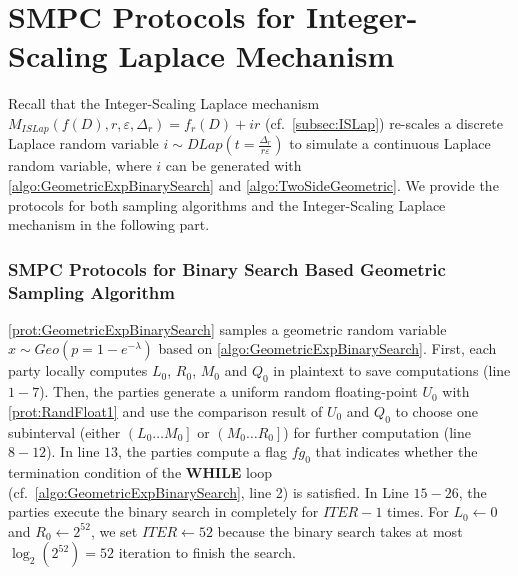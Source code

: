 
                  \section{SMPC Protocols for Integer-Scaling Laplace Mechanism}
                  \label{sec:MPCProtocolsforInteger-ScalingLaplaceMechanism}
                  Recall that the Integer-Scaling Laplace mechanism $M_{ISLap}\left(f\left(D\right),r,\varepsilon,\Delta _r\right)=f_r\left(D\right) +ir$ (cf.~\autoref{subsec:ISLap}) re-scales a discrete Laplace random variable $i \sim DLap\left(t=\frac{\Delta_r}{r\varepsilon}\right) $ to simulate a continuous Laplace random variable, where $i$ can be generated with \autoref{algo:GeometricExpBinarySearch} and \autoref{algo:TwoSideGeometric}. We provide the \smpc protocols for both sampling algorithms and the Integer-Scaling Laplace mechanism in the following part.

                  \subsubsection{SMPC Protocols for Binary Search Based Geometric Sampling Algorithm}
                  \label{subsec::MPCProtocolsforBinarySearchBasedGeometricSamplingAlgorithm}
                  \autoref{prot:GeometricExpBinarySearch} samples a geometric random variable $x\sim Geo\left(p=1-e^{-\lambda}\right) $ based on \autoref{algo:GeometricExpBinarySearch}.
                  First, each party locally computes $L_0$, $R_0$, $M_0$ and $Q_0$ in plaintext to save \smpc computations (line $1-7$).
                  Then, the parties generate a uniform random floating-point $U_0$ with \autoref{prot:RandFloat1} and use the comparison result of $U_0$ and $Q_0$ to choose one subinterval (either $\left(L_0\ldots M_0\right] $ or $\left(M_0\ldots R_0\right] $) for further computation (line $8-12$).
      In line $13$, the parties compute a flag $fg_0$ that indicates whether the termination condition of the \textbf{WHILE} loop (cf.~\autoref{algo:GeometricExpBinarySearch}, line 2) is satisfied.
      In Line $15-26$, the parties execute the binary search in \smpc completely for $ITER-1$ times.
      For $L_0\gets 0 $ and $R_0 \gets 2^52$, we set $ITER\gets 52$ because the binary search takes at most $\log_2\left(2^{52}\right)=52 $ iteration to finish the search.


